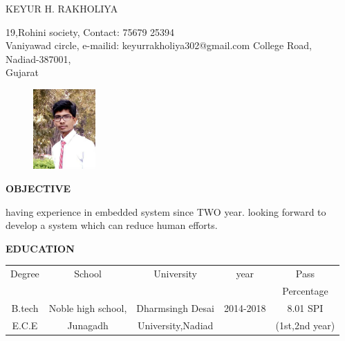 \documentclass{article}
\begin{document}
 \begin{center}
 	 {
 	 	\large { KEYUR H. RAKHOLIYA}
 	 }
 	
 \end{center}
   \hline
 \begin{flushleft}
 	19,Rohini society, 		\hspace{2.8in}    		    Contact: 75679 25394            \\
 	Vaniyawad circle, 		\hspace{2.8in}		    	e-mailid: keyurrakholiya302@gmail.com
 	College Road, \\
	Nadiad-387001,     \\
 	Gujarat       \\
 \end{flushleft}
 \vspace{-0.3in}

 \begin{figure}[h]
    \hspace{4.4in}
	\includegraphics[width=90px]{keyur}
 \end{figure}
 
 \begin{flushleft}
 	\textbf{OBJECTIVE}
 	
 	\vspace{-0.20in}
 	\hspace{1.5in}
 	having experience in embedded system since TWO year. looking forward to develop a system which can reduce human efforts.
 \end{flushleft}
 
 \begin{flushleft}
 	\textbf{EDUCATION}
 	\hspace{0.45in}
 	\begin{tabular}{|c|c|c|c|c|}
 		\hline
 		Degree & School & University &  year & Pass   \\
 		&        &            &              & Percentage\\
 		\hline
 		
 		B.tech & Noble high school, & Dharmsingh Desai & 2014-2018 &8.01 SPI\\
 	E.C.E	&Junagadh & University,Nadiad& &(1st,2nd year) \\
 		\hline
 	\end{tabular}
 \end{flushleft}
 
\end{document}
